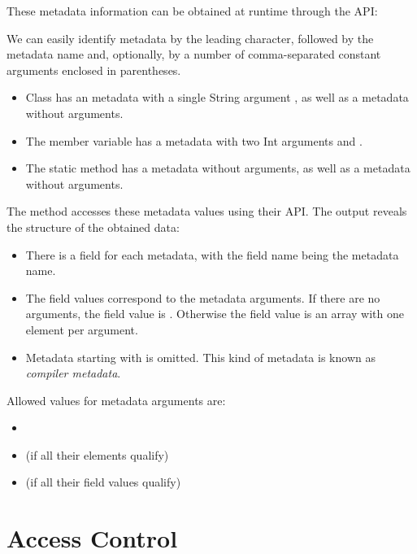 \documentclass{haxe}
\begin{document}
These metadata information can be obtained at runtime through the  API:


We can easily identify metadata by the leading  character, followed by the metadata name and, optionally, by a number of comma-separated constant arguments enclosed in parentheses.

\begin{itemize}
	\item Class  has an  metadata with a single String argument , as well as a  metadata without arguments.
	\item The member variable  has a  metadata with two Int arguments  and .
	\item The static method  has a  metadata without arguments, as well as a  metadata without arguments.
\end{itemize}

The  method accesses these metadata values using their API. The output reveals the structure of the obtained data:

\begin{itemize}
	\item There is a field for each metadata, with the field name being the metadata name.
	\item The field values correspond to the metadata arguments. If there are no arguments, the field value is . Otherwise the field value is an array with one element per argument.
	\item Metadata starting with \expr{:} is omitted. This kind of metadata is known as \emph{compiler metadata}.
\end{itemize}

Allowed values for metadata arguments are:

\begin{itemize}
	\item {}
	\item {} (if all their elements qualify)
	\item {} (if all their field values qualify)
\end{itemize}

\section{Access Control}
\label{lf-access-control}
\end{document}
